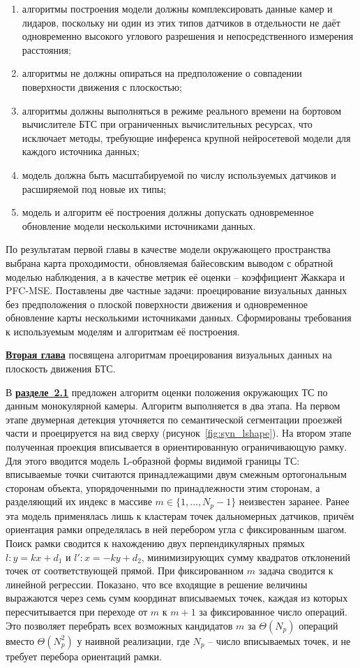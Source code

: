 \begin{enumerate}[beginpenalty=10000]
	\item алгоритмы построения модели должны комплексировать данные камер и лидаров, поскольку ни один из этих типов датчиков в отдельности не даёт одновременно высокого углового разрешения и непосредственного измерения расстояния;
	\item алгоритмы не должны опираться на предположение о совпадении поверхности движения с плоскостью;
	\item алгоритмы должны выполняться в режиме реального времени на бортовом вычислителе БТС при ограниченных вычислительных ресурсах, что исключает методы, требующие инференса крупной нейросетевой модели для каждого источника данных;
	\item модель должна быть масштабируемой по числу используемых датчиков и расширяемой под новые их типы;
	\item модель и алгоритм её построения должны допускать одновременное обновление модели несколькими источниками данных.
\end{enumerate}

По результатам первой главы в качестве модели окружающего пространства выбрана карта проходимости, обновляемая байесовским выводом с обратной моделью наблюдения, а в качестве метрик её оценки -- коэффициент Жаккара и PFC-MSE. Поставлены две частные задачи: проецирование визуальных данных без предположения о плоской поверхности движения и одновременное обновление карты несколькими источниками данных. Сформированы требования к используемым моделям и алгоритмам её построения.

\underline{\textbf{Вторая глава}} посвящена алгоритмам проецирования визуальных данных на плоскость движения БТС.

В \underline{\textbf{разделе~2.1}} предложен алгоритм оценки положения окружающих ТС по данным монокулярной камеры. Алгоритм выполняется в два этапа. На первом этапе двумерная детекция уточняется по семантической сегментации проезжей части и проецируется на вид сверху (рисунок~\ref{fig:syn_lshape}). На втором этапе полученная проекция вписывается в ориентированную ограничивающую рамку. Для этого вводится модель L-образной формы видимой границы ТС: вписываемые точки считаются принадлежащими двум смежным ортогональным сторонам объекта, упорядоченными по принадлежности этим сторонам, а разделяющий их индекс в массиве $m \in \{1,\dots,N_p-1\}$ неизвестен заранее. Ранее эта модель применялась лишь к кластерам точек дальномерных датчиков, причём ориентация рамки определялась в ней перебором угла с фиксированным шагом. Поиск рамки сводится к нахождению двух перпендикулярных прямых $l: y = kx + d_1$ и $l': x = -ky + d_2$, минимизирующих сумму квадратов отклонений точек от соответствующей прямой. При фиксированном $m$ задача сводится к линейной регрессии. Показано, что все входящие в решение величины выражаются через семь сумм координат вписываемых точек, каждая из которых пересчитывается при переходе от $m$ к $m+1$ за фиксированное число операций. Это позволяет перебрать всех возможных кандидатов $m$ за $\Theta(N_p)$ операций вместо $\Theta(N_p^2)$ у наивной реализации, где $N_p$ -- число вписываемых точек, и не требует перебора ориентаций рамки.

